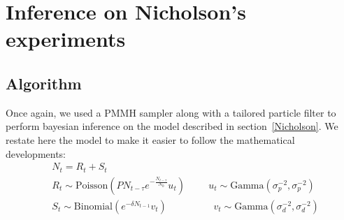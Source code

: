 \documentclass[12pt]{article}
\begin{document}
	\section{Inference on Nicholson's experiments} \label{infNicholson}
	\subsection{Algorithm}
		Once again, we used a PMMH sampler along with a tailored particle filter to perform bayesian inference on the model described in section~\ref{Nicholson}. We restate here the model to make it easier to follow the mathematical developments:
		\begin{align*}
		& N_t = R_t + S_t \\
		& R_t \sim  \mathrm{Poisson}(PN_{t-\tau}e^{-\frac{N_{t-\tau}}{N_0}}u_t)  \hspace{1cm} u_t \sim \mathrm{Gamma}(\sigma_p^{-2}, \sigma_p^{-2})\\ 
		& S_t \sim \mathrm{Binomial}(e^{-\delta N_{t-1}}v_t) \hspace{2cm}  v_t \sim \mathrm{Gamma}(\sigma_d^{-2}, \sigma_d^{-2}) 
		\end{align*}
\end{document}
